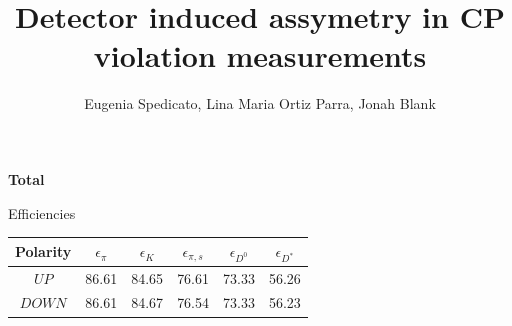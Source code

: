 \documentclass[11pt]{beamer}
\author{Eugenia Spedicato, Lina Maria Ortiz Parra, Jonah Blank}
\title{Detector induced assymetry in CP violation measurements}
\begin{document}
\begin{frame}
\titlepage
\end{frame}


\begin{frame}
\begin{LARGE}
\textbf{Total}
\end{LARGE}
\end{frame}
\begin{frame}{Efficiencies}
\begin{table}
	\begin{tabular}{cS[table-format=2.4]S[table-format=2.4]S[table-format=2.4]S[table-format=2.4]S[table-format=2.4]}
		\toprule
		{Polarity} & {$\epsilon_{\pi} $} & {$\epsilon_{K} $} & {$ \epsilon_{\pi,s} $} & {$\epsilon_{D^0} $} & {$\epsilon_{D^*} $} \\
		\midrule
		$UP$ & 86.61  & 84.65  & 76.61  & 73.33  & 56.26  \\
		$DOWN$ & 86.61   & 84.67  & 76.54  & 73.33  & 56.23  \\
		\bottomrule
	\end{tabular}
\end{table}
\end{frame}
\end{document}
